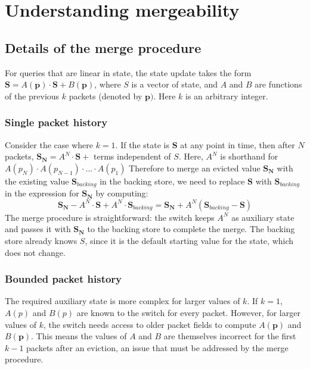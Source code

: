 
\chapter{Understanding mergeability}
\label{app:merge}

\section{Details of the merge procedure}

For queries that are linear in state, the state update takes the form $\mathbf{S} = A(\mathbf{p})\cdot\mathbf{S} + B(\mathbf{p})$, where $S$ is a vector of state, and $A$ and $B$ are functions of the previous $k$ packets (denoted by $\mathbf{p})$. Here $k$ is an arbitrary integer.

\subsection{Single packet history}

Consider the case where $k = 1$. If the state is $\mathbf{S}$ at any point in time, then after $N$ packets,
$\mathbf{S_N} = A^N\cdot \mathbf{S} + $ terms independent of $S$. Here, $A^N$ is shorthand for $A(p_N)\cdot A(p_{N-1}) \cdot \ldots \cdot A(p_1)$
Therefore to merge an evicted value $\mathbf{S_N}$ with the existing value $\mathbf{S}_{backing}$ in the backing store,
we need to replace $\mathbf{S}$ with $\mathbf{S}_{backing}$ in the expression for $\mathbf{S_N}$ by computing:
\[ \mathbf{S_N} - A^N \cdot \mathbf{S} + A^N \cdot \mathbf{S}_{backing} = \mathbf{S_N} + A^N(\mathbf{S}_{backing} - \mathbf{S}) \]
The merge procedure is straightforward: the switch keeps $A^N$ as auxiliary state and passes it with $\mathbf{S_N}$ to the backing store to complete the merge.
The backing store already knows $S$, since it is the default starting value for the state, which does not change.

\subsection{Bounded packet history}

The required auxiliary state is more complex for larger values of $k$. If $k = 1$, $A(p)$ and $B(p)$ are known to the switch for every packet. However, for larger values of $k$, the switch needs access to older packet fields to compute $A(\mathbf{p})$ and $B(\mathbf{p})$. This means the values of $A$ and $B$ are themselves incorrect for the first $k-1$ packets after an eviction, an issue that must be addressed by the merge procedure.

